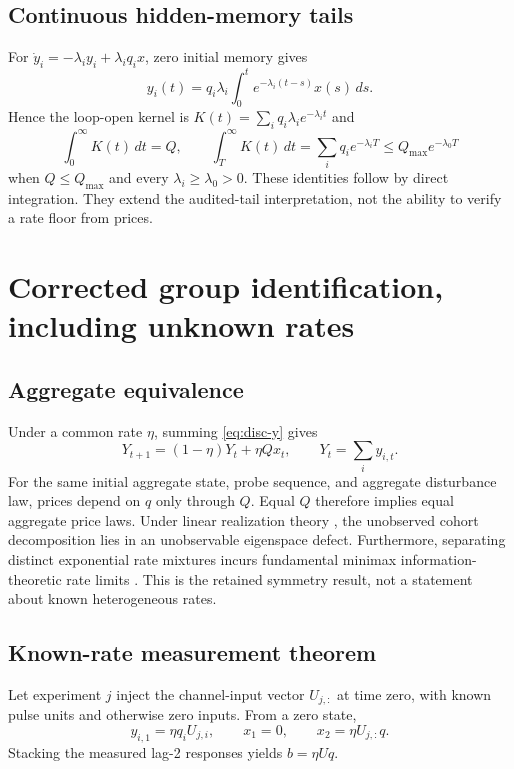 \documentclass[11pt,a4paper]{article}
\theoremstyle{definition}\newtheorem{definition}[theorem]{Definition}
\theoremstyle{remark}\newtheorem{remark}[theorem]{Remark}
\begin{document}
\subsection{Continuous hidden-memory tails}
For $\dot y_i=-\lambda_i y_i+\lambda_iq_i x$, zero initial memory gives
\[
 y_i(t)=q_i\lambda_i\int_0^t e^{-\lambda_i(t-s)}x(s)\,ds.
\]
Hence the loop-open kernel is $K(t)=\sum_iq_i\lambda_i e^{-\lambda_i t}$ and
\[
 \int_0^\infty K(t)\,dt=Q,
 \qquad \int_T^\infty K(t)\,dt=\sum_iq_ie^{-\lambda_iT}
 \le Q_{\max}e^{-\lambda_0T}
\]
when $Q\le Q_{\max}$ and every $\lambda_i\ge\lambda_0>0$. These identities follow by direct integration. They extend the audited-tail interpretation, not the ability to verify a rate floor from prices.

\section{Corrected group identification, including unknown rates}
\subsection{Aggregate equivalence}
Under a common rate $\eta$, summing \eqref{eq:disc-y} gives
\[
 Y_{t+1}=(1-\eta)Y_t+\eta Qx_t,\qquad Y_t=\sum_i y_{i,t}.
\]
For the same initial aggregate state, probe sequence, and aggregate disturbance law, prices depend on $q$ only through $Q$. Equal $Q$ therefore implies equal aggregate price laws. Under linear realization theory \cite{ho1966,hautus1969}, the unobserved cohort decomposition lies in an unobservable eigenspace defect. Furthermore, separating distinct exponential rate mixtures incurs fundamental minimax information-theoretic rate limits \cite{chen1995optimal,heinrich2018,wuyang2020}. This is the retained symmetry result, not a statement about known heterogeneous rates.

\subsection{Known-rate measurement theorem}
Let experiment $j$ inject the channel-input vector $U_{j,:}$ at time zero, with known pulse units and otherwise zero inputs. From a zero state,
\[
 y_{i,1}=\eta q_iU_{j,i},\qquad x_1=0,\qquad x_2=\eta U_{j,:}q.
\]
Stacking the measured lag-2 responses yields $b=\eta Uq$.
\end{document}
